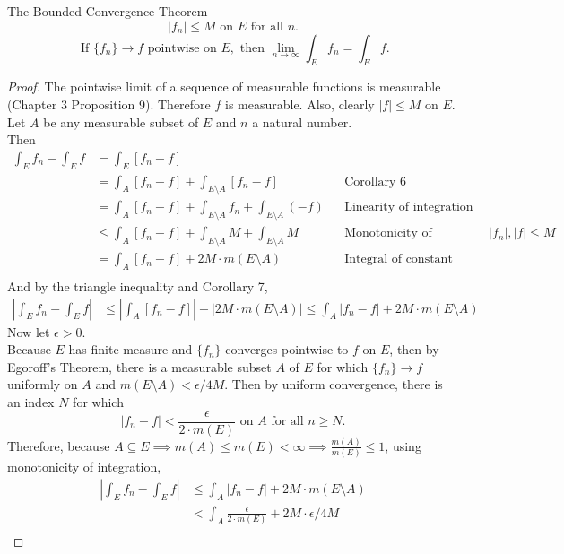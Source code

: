 \begin{flushleft}
\begin{namedthm*}{The Bounded Convergence Theorem}
        \[
            |f_n|\le M\text{ on }E\text{ for all }n.
        \]
        \[
            \text{ If }\{f_n\}\to f\text{ pointwise on }E,\text{ then }\lim_{n\to\infty}\int_Ef_n=\int_Ef.   
        \]
    \end{namedthm*}
    \begin{proof}
        The pointwise limit of a sequence of measurable functions is measurable (Chapter 3 Proposition 9).
        Therefore $f$ is measurable.
        Also, clearly $|f|\le M$ on $E$.
        Let $A$ be any measurable subset of $E$ and $n$ a natural number.
        \\Then
        \begin{align*}
            \int_Ef_n-\int_Ef&=\int_E[f_n-f]\\
            &=\int_A[f_n-f]+\int_{E\setminus A}[f_n-f]&&\text{Corollary 6}\\
            &=\int_A[f_n-f]+\int_{E\setminus A}f_n+\int_{E\setminus A}(-f)&&\text{Linearity of integration}\\
            &\le\int_A[f_n-f]+\int_{E\setminus A}M+\int_{E\setminus A}M&&\text{Monotonicity of integration: }|f_n|,|f|\le M\\
            &=\int_A[f_n-f]+2M\cdot m(E\setminus A)&&\text{Integral of constant functions}\\
        \end{align*} 
        And by the triangle inequality and Corollary 7,
        \begin{align*}
            \left|\int_Ef_n-\int_Ef\right|
            &\le|\int_A[f_n-f]|+|2M\cdot m(E\setminus A)|
            \le\int_A|f_n-f|+2M\cdot m(E\setminus A)
        \end{align*}
        Now let $\epsilon>0$.
        \\Because $E$ has finite measure and $\{f_n\}$ converges pointwise to $f$ on $E$, then by Egoroff's Theorem, there is a measurable subset $A$ of $E$ for which $\{f_n\}\to f$ uniformly on $A$ and $m(E\setminus A)<\epsilon/4M$.
        Then by uniform convergence, there is an index $N$ for which 
        \[
            |f_n-f|<\frac{\epsilon}{2\cdot m(E)}\text{ on }A\text{ for all }n\ge N.
        \]
        Therefore, because $A\subseteq E\implies m(A)\le m(E)<\infty\implies \frac{m(A)}{m(E)}\le1$, using monotonicity of integration,
        \begin{align*}
            \left|\int_Ef_n-\int_Ef\right|&\le\int_A|f_n-f|+2M\cdot m(E\setminus A)\\
            &<\int_A\frac{\epsilon}{2\cdot m(E)}+2M\cdot\epsilon/4M\\

\end{align*}
\end{proof}
\end{flushleft}
